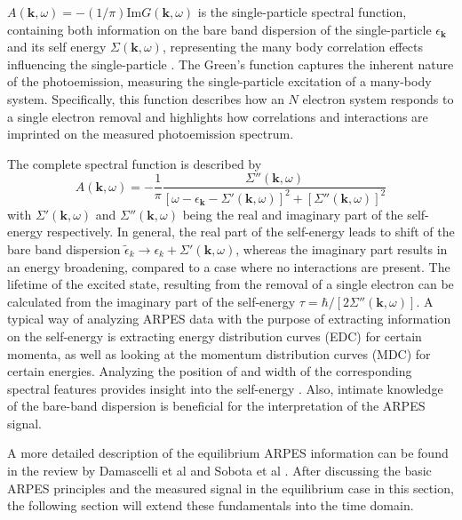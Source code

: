 $A(\mathbf{k}, \omega)=-(1/\pi)\text{Im}G(\mathbf{k}, \omega)$ is the single-particle spectral function, containing both information on the bare band dispersion of the single-particle $\epsilon_\mathbf{k}$ and its self energy $\Sigma(\mathbf{k}, \omega)$, representing the many body correlation effects influencing the single-particle \cite{mahan_many-particle_2000}.
The Green's function captures the inherent nature of the photoemission, measuring the single-particle excitation of a many-body system.
Specifically, this function describes how an $N$ electron system responds to a single electron removal and highlights how correlations and interactions are imprinted on the measured photoemission spectrum.

The complete spectral function is described by
\begin{equation}
	A(\mathbf{k}, \omega)= -\frac{1}{\pi} \frac{\Sigma''(\mathbf{k}, \omega)}{\left[ \omega - \epsilon_\mathbf{k} - \Sigma'(\mathbf{k}, \omega) \right]^2 + \left[ \Sigma''(\mathbf{k}, \omega) \right]^2}
\end{equation}
with $\Sigma'(\mathbf{k}, \omega)$ and $\Sigma''(\mathbf{k}, \omega)$ being the real and imaginary part of the self-energy respectively.
In general, the real part of the self-energy leads to shift of the bare band dispersion $\tilde{\epsilon}_k \rightarrow \epsilon_k + \Sigma'(\mathbf{k}, \omega)$, whereas the imaginary part results in an energy broadening, compared to a case where no interactions are present.
The lifetime of the excited state, resulting from the removal of a single electron can be calculated from the imaginary part of the self-energy $\tau=\hbar/\left[2\Sigma''(\mathbf{k}, \omega)\right]$.
A typical way of analyzing ARPES data with the purpose of extracting information on the self-energy is extracting energy distribution curves (EDC) for certain momenta, as well as looking at the momentum distribution curves (MDC) for certain energies.
Analyzing the position of and width of the corresponding spectral features provides insight into the self-energy \cite{norman_extraction_1999, freericks_what_2021,kurleto_about_2021}.
Also, intimate knowledge of the bare-band dispersion is beneficial for the interpretation of the ARPES signal.

A more detailed description of the equilibrium ARPES information can be found in the review by Damascelli et al and Sobota et al \cite{damascelli_angle-resolved_2003,sobota_angle-resolved_2021}.
After discussing the basic ARPES principles and the measured signal in the equilibrium case in this section, the following section will extend these fundamentals into the time domain.

